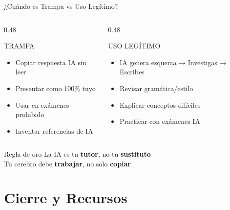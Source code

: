 \documentclass[aspectratio=169,xcolor={dvipsnames}]{beamer}
\begin{document}
	\begin{frame}{¿Cuándo es Trampa vs Uso Legítimo?}
		
		\begin{columns}[T]
			\begin{column}{0.48\textwidth}
				\begin{alertblock}{TRAMPA}
					\begin{itemize}
						\item Copiar respuesta IA sin leer
						\item Presentar como 100\% tuyo
						\item Usar en exámenes prohibido
						\item Inventar referencias de IA
					\end{itemize}
				\end{alertblock}
			\end{column}
			
			\begin{column}{0.48\textwidth}
				\begin{exampleblock}{USO LEGÍTIMO}
					\begin{itemize}
						\item IA genera esquema → Investigas → Escribes
						\item Revisar gramática/estilo
						\item Explicar conceptos difíciles
						\item Practicar con exámenes IA
					\end{itemize}
				\end{exampleblock}
			\end{column}
		\end{columns}
		
		\vspace{0.5cm}
		
		\begin{block}{Regla de oro}
			\centering
			{\large La IA es tu \textbf{tutor}, no tu \textbf{sustituto}}\\[0.3cm]
			
			Tu cerebro debe \textbf{trabajar}, no solo \textbf{copiar}
		\end{block}
		
	\end{frame}
	
	
	\section{Cierre y Recursos}
	
\end{document}
